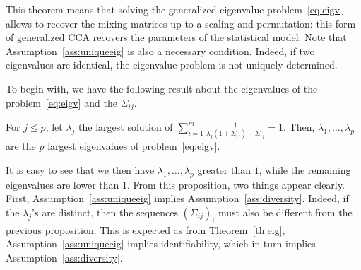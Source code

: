 This theorem means that solving the generalized eigenvalue problem~\eqref{eq:eigv} allows to recover the mixing matrices up to a scaling and permutation: this form of generalized CCA recovers the parameters of the statistical model.
Note that Assumption~\ref{ass:uniqueeig} is also a necessary condition. Indeed, if two eigenvalues are identical, the eigenvalue problem is not uniquely determined.


 To begin with, we have the following result about the eigenvalues of the problem~\eqref{eq:eigv} and the $\Sigma_{ij}$.
\begin{proposition}
  \label{prop:eigvals_from_noise}
  For $j\leq p$, let $\lambda_j$ the largest solution of $ \sum_{i=1}^m\frac{1}{\lambda_j(1 + \Sigma_{ij}) -\Sigma_{ij}}=1$. Then, $\lambda_1, \dots, \lambda_p$ are the $p$ largest eigenvalues of problem~\eqref{eq:eigv}.
\end{proposition}
It is easy to see that we then have $\lambda_1, \dots, \lambda_p$ greater than $1$, while the remaining eigenvalues are lower than $1$.
From this proposition, two things appear clearly. First, Assumption~\ref{ass:uniqueeig} implies Assumption~\ref{ass:diversity}.
%
Indeed, if the $\lambda_j$'s are distinct, then the sequences $(\Sigma_{ij})_i$ must also be different from the previous proposition.
%
This is expected as from Theorem~\ref{th:eig}, Assumption~\ref{ass:uniqueeig} implies identifiability, which in turn implies Assumption~\ref{ass:diversity}.

